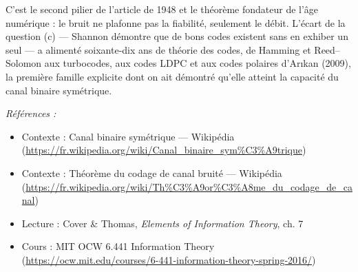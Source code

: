 \documentclass[11pt]{article}
\newenvironment{refs}{\par\small\noindent\emph{Références :}\begin{itemize}\setlength\itemsep{0pt}}{\end{itemize}\normalsize}
\begin{document}
\noindent C'est le second pilier de l'article de 1948 et le théorème fondateur de
l'âge numérique : le bruit ne plafonne pas la fiabilité, seulement le débit. L'écart de la
question (c) --- Shannon démontre que de bons codes existent sans en exhiber un seul --- a
alimenté soixante-dix ans de théorie des codes, de Hamming et Reed--Solomon aux turbocodes,
aux codes LDPC et aux codes polaires d'Ar\i{}kan (2009), la première famille explicite dont on
ait démontré qu'elle atteint la capacité du canal binaire symétrique.

\begin{refs}
\item Contexte : Canal binaire symétrique --- Wikipédia (\url{https://fr.wikipedia.org/wiki/Canal_binaire_sym%C3%A9trique})
\item Contexte : Théorème du codage de canal bruité --- Wikipédia (\url{https://fr.wikipedia.org/wiki/Th%C3%A9or%C3%A8me_du_codage_de_canal})
\item Lecture : Cover \& Thomas, \textit{Elements of Information Theory}, ch. 7
\item Cours : MIT OCW 6.441 Information Theory (\url{https://ocw.mit.edu/courses/6-441-information-theory-spring-2016/})
\end{refs}

\bigskip
\end{document}

